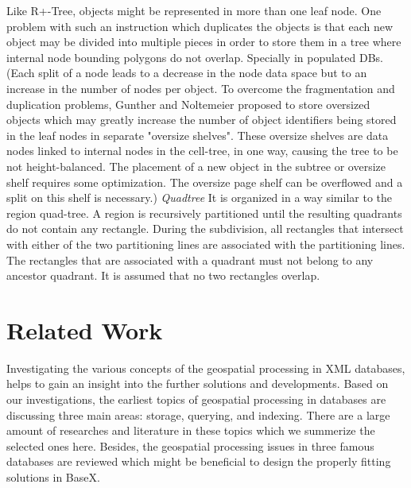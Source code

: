 \documentclass[a4paper,12pt]{article}
\begin{document}
Like R+-Tree, objects might be represented in more than one leaf node. One problem with such an instruction which duplicates the objects is that each new object may be divided into multiple pieces in order to store them in a tree where internal node bounding polygons do not overlap. Specially in populated DBs. 
(Each split of a node leads to a decrease in the node data space but to an increase in the number of nodes per object. To overcome the fragmentation and duplication problems, Gunther and Noltemeier proposed to store oversized objects which may greatly increase the number of object identifiers being stored in the leaf nodes in separate "oversize shelves". These oversize shelves are data nodes linked to internal nodes in the cell-tree, in one way, causing the tree to be not height-balanced. The placement of a new object in the subtree or oversize shelf requires some optimization. The oversize page shelf can be overflowed and a split on this shelf is necessary.)
\emph{Quadtree}
It is organized in a way similar to the region quad-tree. A region is recursively partitioned until the resulting quadrants do not contain any rectangle. During the subdivision, all rectangles that intersect with either of the two partitioning lines are associated with the partitioning lines. The rectangles that are associated with a quadrant must not belong to any ancestor quadrant. It is assumed that no two rectangles overlap.
\newpage








\section{Related Work}
\label{s.rwork}
Investigating the various concepts of the geospatial processing in XML databases, 
helps to gain an insight into the further solutions and developments. 
Based on our investigations, the earliest topics of geospatial processing in databases are discussing three main areas: storage, querying, and indexing. There are a large amount of researches and literature in these topics which we summerize the selected ones here. Besides, the geospatial processing issues in three famous databases are reviewed which might be beneficial to design the properly fitting solutions in BaseX. %
\end{document}
